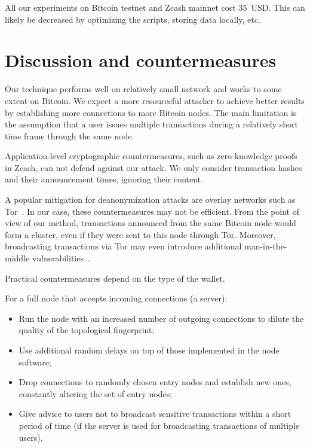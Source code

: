 All our experiments on Bitcoin testnet and Zcash mainnet cost $35$~USD\@.
This can likely be decreased by optimizing the scripts, storing data locally, etc.


\section{Discussion and countermeasures}

Our technique performs well on relatively small network and works to some extent on Bitcoin.
We expect a more resourceful attacker to achieve better results by establishing more connections to more Bitcoin nodes.
The main limitation is the assumption that a user issues multiple transactions during a relatively short time frame through the same node.

Application-level cryptographic countermeasures, such as zero-knowledge proofs in Zcash, can not defend against our attack.
We only consider transaction hashes and their announcement times, ignoring their content.

A popular mitigation for deanonymization attacks are overlay networks such as Tor~\cite{Tor}.
In our case, these countermeasures may not be efficient.
From the point of view of our method, transactions announced from the same Bitcoin node would form a cluster, even if they were sent to this node through Tor.
Moreover, broadcasting transactions via Tor may even introduce additional man-in-the-middle vulnerabilities~\cite{Biryukov2015}.

Practical countermeasures depend on the type of the wallet.

For a full node that accepts incoming connections (a server):

\begin{itemize}
	\item Run the node with an increased number of outgoing connections to dilute the quality of the topological fingerprint;
	\item Use additional random delays on top of those implemented in the node software;
	\item Drop connections to randomly chosen entry nodes and establish new ones, constantly altering the set of entry nodes;
	\item Give advice to users not to broadcast sensitive transactions within a short period of time (if the server is used for broadcasting transactions of multiple users).
\end{itemize}

